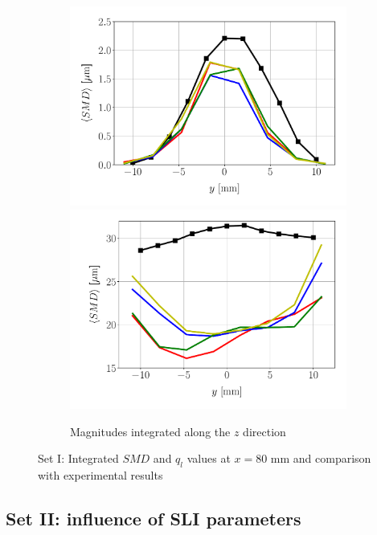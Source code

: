 \begin{figure}[ht]
\begin{subfigure}[b]{0.9\textwidth}
	\flushleft
   \includegraphics[scale=0.3]{./part2_developments/figures_ch6_lagrangian_JICF/expe_validation_set_1/integrated_fluxes_along_y}
   \hfill
   \includegraphics[scale=0.3]{./part2_developments/figures_ch6_lagrangian_JICF/expe_validation_set_1/integrated_SMD_along_y}
	\caption{Magnitudes integrated along the $z$ direction}
\end{subfigure}

   \caption{Set I: Integrated $SMD$ and $q_l$ values at $x = 80$ mm and comparison with experimental results}
\end{figure}


\subsection{Set II: influence of SLI parameters}

